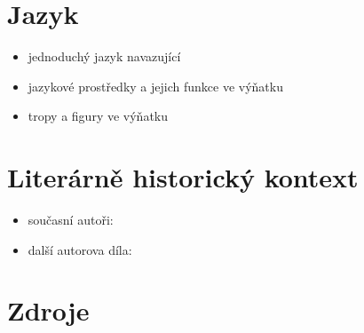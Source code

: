 \documentclass[10pt,a4paper]{article}
\begin{document}
\section*{Jazyk}
\begin{itemize}
\item jednoduchý jazyk navazující 
\item jazykové prostředky a jejich funkce ve výňatku
\item tropy a figury ve výňatku
\end{itemize}
\section*{Literárně historický kontext}
\begin{itemize}
\item současní autoři:
\item další autorova díla:
\end{itemize}
\section*{Zdroje}
\end{document}
